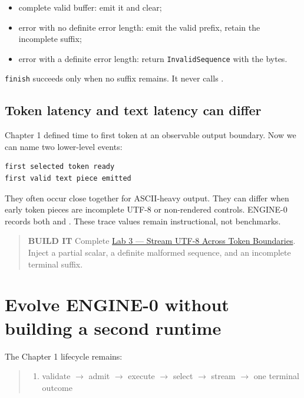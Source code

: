 \begin{itemize}
\tightlist
\item
  complete valid buffer: emit it and clear;
\item
  error with no definite error length: emit the valid prefix, retain the
  incomplete suffix;
\item
  error with a definite error length: return \texttt{InvalidSequence}
  with the bytes.
\end{itemize}

\texttt{finish} succeeds only when no suffix remains. It never calls
\texttt{}.

\subsection{Token latency and text latency can
differ}\label{token-latency-and-text-latency-can-differ}

Chapter 1 defined time to first token at an observable output boundary.
Now we can name two lower-level events:

\begin{verbatim}
first selected token ready
first valid text piece emitted
\end{verbatim}

They often occur close together for ASCII-heavy output. They can differ
when early token pieces are incomplete UTF-8 or non-rendered controls.
ENGINE-0 records both \texttt{} and
\texttt{}. These trace values remain
instructional, not benchmarks.

\begin{quote}
\textbf{BUILD IT} Complete
\href{https://github.com/hermonai/inside-the-llm-engine/blob/astra-visual-rewrite/labs/lab-03-stream-utf8-across-tokens.md}{Lab
3 --- Stream UTF-8 Across Token Boundaries}. Inject a partial scalar, a
definite malformed sequence, and an incomplete terminal suffix.
\end{quote}

\section{Evolve ENGINE-0 without building a second
runtime}\label{evolve-engine-0-without-building-a-second-runtime}

The Chapter 1 lifecycle remains:

\begin{quote}
\begin{enumerate}
\item validate  \(\longrightarrow\)  admit  \(\longrightarrow\)  execute  \(\longrightarrow\)  select  \(\longrightarrow\)  stream  \(\longrightarrow\)  one terminal outcome
\end{enumerate}
\end{quote}


